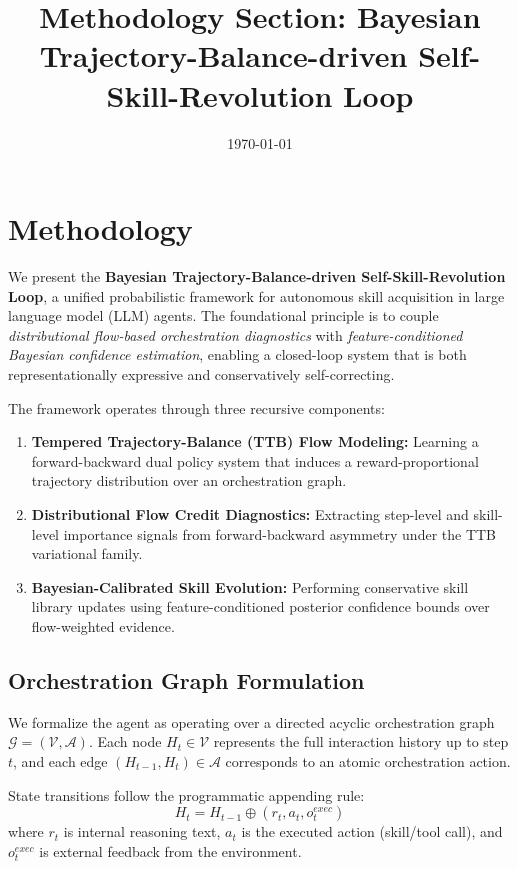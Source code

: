 \documentclass[12pt]{article}
\title{Methodology Section: Bayesian Trajectory-Balance-driven Self-Skill-Revolution Loop}
\date{\today}
\begin{document}
\maketitle

\section{Methodology}

We present the \textbf{Bayesian Trajectory-Balance-driven Self-Skill-Revolution Loop}, a unified probabilistic framework for autonomous skill acquisition in large language model (LLM) agents. The foundational principle is to couple \emph{distributional flow-based orchestration diagnostics} with \emph{feature-conditioned Bayesian confidence estimation}, enabling a closed-loop system that is both representationally expressive and conservatively self-correcting.

The framework operates through three recursive components:
\begin{enumerate}
    \item \textbf{Tempered Trajectory-Balance (TTB) Flow Modeling:} Learning a forward-backward dual policy system that induces a reward-proportional trajectory distribution over an orchestration graph.
    \item \textbf{Distributional Flow Credit Diagnostics:} Extracting step-level and skill-level importance signals from forward-backward asymmetry under the TTB variational family.
    \item \textbf{Bayesian-Calibrated Skill Evolution:} Performing conservative skill library updates using feature-conditioned posterior confidence bounds over flow-weighted evidence.
\end{enumerate}

\subsection{Orchestration Graph Formulation}

We formalize the agent as operating over a directed acyclic orchestration graph $\mathcal{G} = (\mathcal{V}, \mathcal{A})$. Each node $H_t \in \mathcal{V}$ represents the full interaction history up to step $t$, and each edge $(H_{t-1}, H_t) \in \mathcal{A}$ corresponds to an atomic orchestration action.

State transitions follow the programmatic appending rule:
\begin{equation}
H_t = H_{t-1} \oplus (r_t, a_t, o_t^{exec})
\end{equation}
where $r_t$ is internal reasoning text, $a_t$ is the executed action (skill/tool call), and $o_t^{exec}$ is external feedback from the environment.
\end{document}
